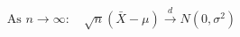 \documentclass[preview]{standalone}
\begin{document}
\begin{align*}
\text{As } n \to \infty: \quad \sqrt{n}(\bar{X} - \mu) \xrightarrow{d} N(0, \sigma^2)
\end{align*}
\end{document}
